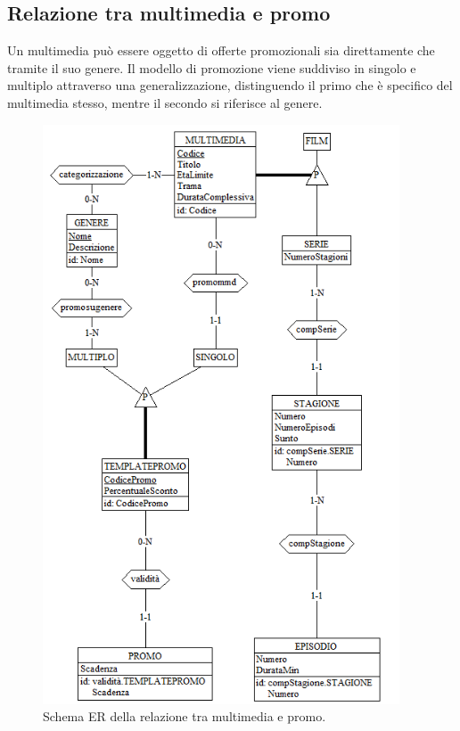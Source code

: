 \documentclass[a4paper,12pt]{report}
\begin{document}
\subsection{Relazione tra multimedia e promo}
Un multimedia può essere oggetto di offerte promozionali sia direttamente che tramite il suo genere. Il modello di promozione viene suddiviso in singolo e multiplo attraverso una generalizzazione, distinguendo il primo che è specifico del multimedia stesso, mentre il secondo si riferisce al genere.
\begin{figure}[H]
	\centering
	\includegraphics[width=300pt]{ER/multimediapromo.png}
	\caption{Schema ER della relazione tra multimedia e promo.}
\end{figure}
\end{document}
